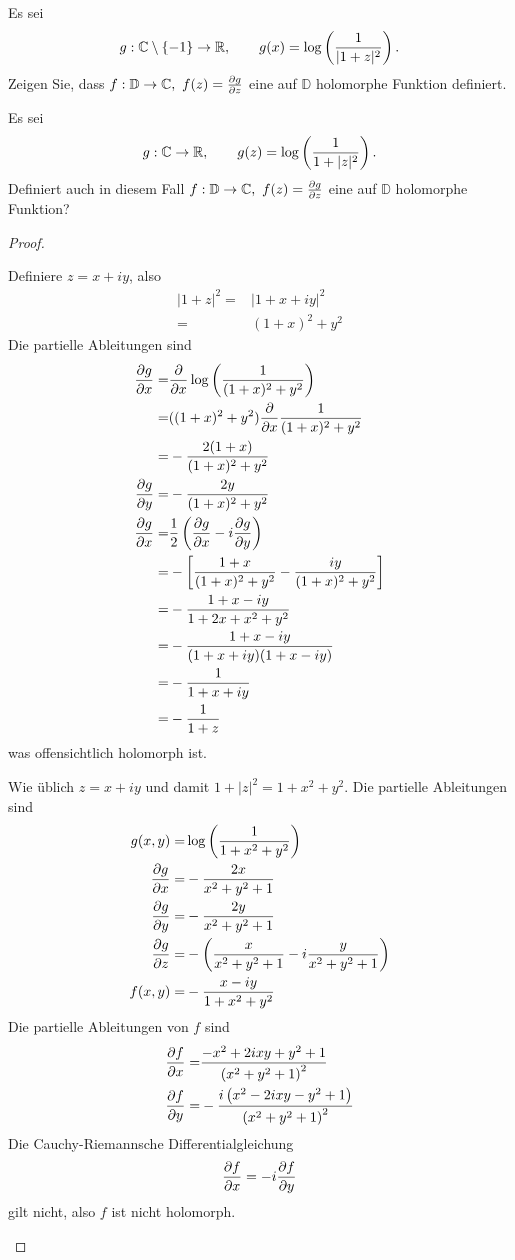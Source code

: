 \begin{Problem}
	\begin{parts}
	\item Es sei
		\[
		g:\mathbb{C}\setminus \{-1\} \to \mathbb{R}, \qquad g(x)=\log\left( \frac{1}{|1+z|^2} \right)
		.\] 
		Zeigen Sie, dass $f:\mathbb{D}\to \mathbb{C},~f(z)=\pdv{g}{z}(z)$ eine auf $\mathbb{D}$ holomorphe Funktion definiert.
	\item Es sei
		\[
		g:\mathbb{C}\to \mathbb{R},\qquad g(z)=\log\left( \frac{1}{1+|z|^2} \right)
		.\] 
		Definiert auch in diesem Fall $f:\mathbb{D}\to \mathbb{C},~f(z)=\pdv{g}{z}(z)$ eine auf $\mathbb{D}$ holomorphe Funktion?
	\end{parts}
\end{Problem}
\begin{proof}
	\begin{parts}
	\item Definiere $z=x+iy$, also
	\begin{align*}
		|1+z|^2=&|1+x+iy|^2\\
		=&(1+x)^2 + y^2
	\end{align*}
	Die partielle Ableitungen sind
	\begin{align*}
		\pdv{g}{x}=&\pdv{x} \log\left( \frac{1}{(1+x)^2+y^2} \right)\\
		=& ( (1+x)^2+y^2) \pdv{x} \frac{1}{(1+x)^2+y^2}\\
		=& -\frac{2(1+x)}{(1+x)^2+y^2}\\
		\pdv{g}{y}=&-\frac{2y}{(1+x)^2+y^2}\\
		\pdv{g}{x}=& \frac{1}{2}\left( \pdv{g}{x}-i\pdv{g}{y} \right)\\
		=&-\left[\frac{1+x}{(1+x)^2+y^2}-\frac{iy}{(1+x)^2+y^2} \right]\\
		=&- \frac{1+x-iy}{1+2x+x^2+y^2}\\
		=&- \frac{1+x-iy}{(1+x+iy)(1+x-iy)}\\
		=&-\frac{1}{1+x+iy}\\
		=&- \frac{1}{1+z}
	\end{align*}
	was offensichtlich holomorph ist.
\item Wie üblich $z=x+iy$ und damit $1+|z|^2=1+x^2+y^2$. Die partielle Ableitungen sind
	\begin{align*}
	g(x,y)=& \log\left( \frac{1}{1+x^2+y^2} \right)\\
	\pdv{g}{x}=&-\frac{2 x}{x^2+y^2+1}\\
	\pdv{g}{y}=&-\frac{2 y}{x^2+y^2+1}\\
	\pdv{g}{z}=&-\left( \frac{x}{x^2+y^2+1}-i\frac{y}{x^2+y^2+1} \right)\\
	f(x,y)=&-\frac{x-iy}{1+x^2+y^2}
	\end{align*}
	Die partielle Ableitungen von $f$ sind
	\begin{align*}
		\pdv{f}{x}=&\frac{-x^2+2 i x y+y^2+1}{\left(x^2+y^2+1\right)^2}\\
		\pdv{f}{y}=&-\frac{i \left(x^2-2 i x y-y^2+1\right)}{\left(x^2+y^2+1\right)^2} 
	\end{align*}
	Die Cauchy-Riemannsche Differentialgleichung
	\[
	\pdv{f}{x}=-i\pdv{f}{y}
	\]
	gilt nicht, also $f$ ist nicht holomorph.\qedhere
\end{parts}
\end{proof}

